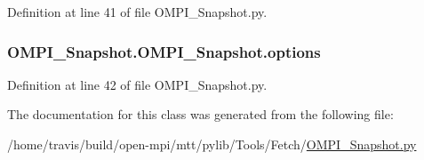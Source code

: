 Definition at line 41 of file O\-M\-P\-I\-\_\-\-Snapshot.\-py.

\hypertarget{classOMPI__Snapshot_1_1OMPI__Snapshot_a1977ca5a7120bd199d1de101a0fb8c34}{
\subsubsection[{options}]{\setlength{\rightskip}{0pt plus 5cm}O\-M\-P\-I\-\_\-\-Snapshot.\-O\-M\-P\-I\-\_\-\-Snapshot.\-options}}\label{classOMPI__Snapshot_1_1OMPI__Snapshot_a1977ca5a7120bd199d1de101a0fb8c34}


Definition at line 42 of file O\-M\-P\-I\-\_\-\-Snapshot.\-py.



The documentation for this class was generated from the following file\-:\begin{DoxyCompactItemize}
\item 
/home/travis/build/open-\/mpi/mtt/pylib/\-Tools/\-Fetch/\hyperlink{OMPI__Snapshot_8py}{O\-M\-P\-I\-\_\-\-Snapshot.\-py}\end{DoxyCompactItemize}
